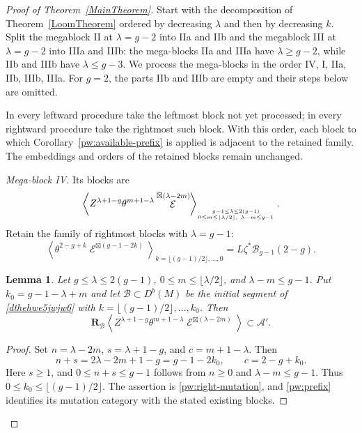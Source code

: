 \documentclass[11pt,letterpaper]{amsart}
\theoremstyle{plain}
\newtheorem{lemma}[theorem]{Lemma}
\theoremstyle{definition}
\theoremstyle{remark}
\numberwithin{equation}{section}
\DeclareMathOperator{\cE}{\mathcal{E}}
\begin{document}
\begin{proof}[Proof of Theorem~\ref{MainTheorem}]
Start with the  decomposition of Theorem~\ref{LoomTheorem}
ordered by decreasing $\lambda$ and then by decreasing $k$.  
Split the megablock II at
$\lambda=g-2$ into IIa and IIb and the megablock III at $\lambda=g-2$ into IIIa and IIIb: the mega-blocks
IIa and IIIa have $\lambda\geq g-2$, while IIb and IIIb have
$\lambda\leq g-3$.  We process the mega-blocks in the order
IV, I, IIa, IIb, IIIb, IIIa.
For $g=2$, the parts IIb and IIIb are empty and their steps below are omitted.

In every leftward procedure take the leftmost block not yet processed;
in every rightward procedure take the rightmost such block.
With this order, each block to which Corollary~\ref{pw:available-prefix}
is applied is adjacent to the retained family. The embeddings and
orders of the retained blocks remain unchanged.


\smallskip
\noindent\textit{Mega-block IV.}
Its blocks are
\begin{equation}\label{sRGSRGDRH}
 \left\langle Z^{\lambda+1-g}\theta^{m+1-\lambda}
       \cE^{\boxtimes(\lambda-2m)}\right\rangle_{{g-1\leq\lambda\leq2(g-1)}\atop
       {0\leq m\leq\lfloor\lambda/2\rfloor,\ \lambda-m\leq g-1}}.
\end{equation}
Retain the  family of rightmost blocks with $\lambda=g-1$:
\begin{equation}\label{dthehwe5jwjw6}
 \left\langle\theta^{2-g+k}\cE^{\boxtimes(g-1-2k)}
 \right\rangle_{k=\lfloor(g-1)/2\rfloor,\ldots,0}
       =L\zeta^*\mathcal B_{g-1}(2-g).
\end{equation}

\begin{lemma}\label{megablockiv}
Let $g\leq\lambda\leq2(g-1)$,
$0\leq m\leq\lfloor\lambda/2\rfloor$, and $\lambda-m\leq g-1$.
Put $k_0=g-1-\lambda+m$ and let $\mathcal B\subset D^b(M)$ be the
initial segment of \eqref{dthehwe5jwjw6} with
$
 k=\lfloor(g-1)/2\rfloor,\ldots,k_0$.
Then
\[
 \mathbf R_{\mathcal B}
 \left\langle Z^{\lambda+1-g}\theta^{m+1-\lambda}
       \cE^{\boxtimes(\lambda-2m)}\right\rangle
       \subset\mathcal A'.
\]
\end{lemma}

\begin{proof}
Set $n=\lambda-2m$, $s=\lambda+1-g$, and $c=m+1-\lambda$.
Then
\[
 n+s=2\lambda-2m+1-g=g-1-2k_0,\qquad c=2-g+k_0.
\]
Here $s\geq1$, and $0\leq n+s\leq g-1$ follows from $n\geq0$
and $\lambda-m\leq g-1$.  Thus $0\leq k_0\leq\lfloor(g-1)/2\rfloor$.
The assertion is \eqref{pw:right-mutation}, and \eqref{pw:prefix}
identifies its mutation category with the stated existing blocks.
\end{proof}


\end{proof}
\end{document}
